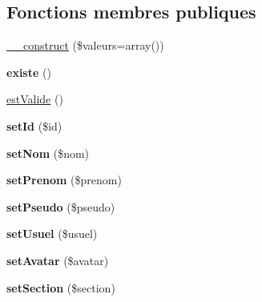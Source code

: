 \subsection*{Fonctions membres publiques}
\begin{DoxyCompactItemize}
\item 
\hyperlink{class_library_1_1_entities_1_1_membre_a6a8dd1d972925f6a5e98fadc554f6710}{\+\_\+\+\_\+construct} (\$valeurs=array())
\item 
\hypertarget{class_library_1_1_entities_1_1_membre_ab8d4d5d88bf20eccb470f6c675299675}{{\bfseries existe} ()}\label{class_library_1_1_entities_1_1_membre_ab8d4d5d88bf20eccb470f6c675299675}

\item 
\hyperlink{class_library_1_1_entities_1_1_membre_ad2696392106fc5da9c1ab0e5f8985531}{est\+Valide} ()
\item 
\hypertarget{class_library_1_1_entities_1_1_membre_a87313ad678fb2a2a8efb435cf0bdb9a0}{{\bfseries set\+Id} (\$id)}\label{class_library_1_1_entities_1_1_membre_a87313ad678fb2a2a8efb435cf0bdb9a0}

\item 
\hypertarget{class_library_1_1_entities_1_1_membre_a3c162f28ffbb9c8026c0d84f722e5060}{{\bfseries set\+Nom} (\$nom)}\label{class_library_1_1_entities_1_1_membre_a3c162f28ffbb9c8026c0d84f722e5060}

\item 
\hypertarget{class_library_1_1_entities_1_1_membre_aab06d96cb012bde67fdbf4f8bfdad2a8}{{\bfseries set\+Prenom} (\$prenom)}\label{class_library_1_1_entities_1_1_membre_aab06d96cb012bde67fdbf4f8bfdad2a8}

\item 
\hypertarget{class_library_1_1_entities_1_1_membre_a1d65ce1d25ffb871a48d33715e6b6bef}{{\bfseries set\+Pseudo} (\$pseudo)}\label{class_library_1_1_entities_1_1_membre_a1d65ce1d25ffb871a48d33715e6b6bef}

\item 
\hypertarget{class_library_1_1_entities_1_1_membre_af1a8a898b909cf98a1a7b51a850a595b}{{\bfseries set\+Usuel} (\$usuel)}\label{class_library_1_1_entities_1_1_membre_af1a8a898b909cf98a1a7b51a850a595b}

\item 
\hypertarget{class_library_1_1_entities_1_1_membre_ab3f6bb399af7466a06fccfc36ccb098d}{{\bfseries set\+Avatar} (\$avatar)}\label{class_library_1_1_entities_1_1_membre_ab3f6bb399af7466a06fccfc36ccb098d}

\item 
\hypertarget{class_library_1_1_entities_1_1_membre_a2ca397c0e3ef5008c332c2e013e34a1b}{{\bfseries set\+Section} (\$section)}\label{class_library_1_1_entities_1_1_membre_a2ca397c0e3ef5008c332c2e013e34a1b}


\end{DoxyCompactItemize}
